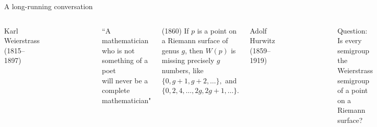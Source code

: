 \documentclass[12pt, aspectratio=169]{beamer}
\begin{document}
 \begin{frame}{A long-running conversation}
 
\begin{columns}
\alert{Karl Weierstrass} (1815--1897)
\begin{figure}
    \flushleft
    \includegraphics[width=.3\textwidth]{"KarlWeierstrassSmall.pdf"}
\end{figure}
  
\begin{small}
 ``A mathematician who is not something of a poet\\ will never be a complete mathematician" 
\end{small}
 \smallskip
 
(1860) If $p$ is a point on a Riemann surface of genus $g$,
 then $W(p)$ is missing precisely $g$ numbers, like
 $
\{0,g+1,g+2,\dots\},
 $
 and
$
\{0,2, 4,\dots, 2g, 2g+1,\dots\}.
 $
 
\alert{Adolf Hurwitz} (1859--1919)
\begin{figure}
    \flushleft
    \includegraphics[width=.4\textwidth]{"Adolf_Hurwitz.jpg"}
\end{figure}
\begin{small}
 \begin{block}{Question:}
Is every semigroup the Weierstrass semigroup of a point
on a Riemann surface?
\end{block}
 \end{small}
\end{columns}

\end{frame}
\end{document}
